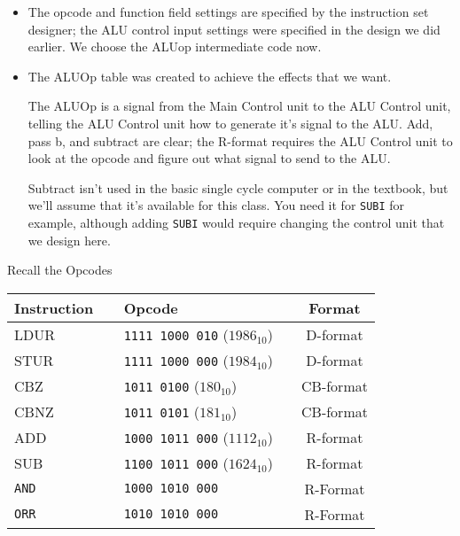 \begin{frame}[fragile]
\begin{itemize}
\item The opcode and function field settings are specified by the
	instruction set designer; the ALU control input settings were
	specified in the design we did earlier. We choose the ALUop
	intermediate code now.

\item The ALUOp table was created to achieve the effects that we want.

	The ALUOp is a signal from the Main Control unit to the ALU Control unit,
		telling the ALU Control unit how to generate it's signal to
		the ALU.  Add, pass b, and subtract are clear; the R-format
		requires the ALU Control unit to look at the opcode and figure
		out what signal to send to the ALU.

	Subtract isn't used in the basic single cycle computer or in the textbook, but we'll assume that it's
		available for this class.  You need it for \texttt{SUBI} for example,
		although adding \texttt{SUBI} would require changing the control unit that we design
		here.
\end{itemize}
\fi\ENotes
\end{frame}


\begin{frame}{Recall the Opcodes}
     \begin{center}
  \begin{tabular}{llc}
    Instruction~~ & Opcode & Format\\
    \hline
    LDUR & \texttt{1111\,1000\,010} {\tiny{($1986_{10}$)}} & D-format\\
     STUR & \texttt{1111\,1000\,000} {\tiny{($1984_{10}$)}} & D-format\\
      CBZ  & \texttt{1011\,0100} {\tiny{($180_{10}$)}}& CB-format\\
    CBNZ & \texttt{1011\,0101} {\tiny{($181_{10}$)}}& CB-format\\
    \hline
    ADD  & \texttt{1000\,1011\,000} {\tiny{($1112_{10}$)}}~~ & R-format\\
    SUB  & \texttt{1100\,1011\,000} {\tiny{($1624_{10}$)}} & R-format\\
   {\tt AND} & \texttt{1000\,1010\,000} & R-Format\\
	 {\tt ORR} & \texttt{1010\,1010\,000} & R-Format\\\hline
  
  \end{tabular}
  \end{center}
\end{frame}

